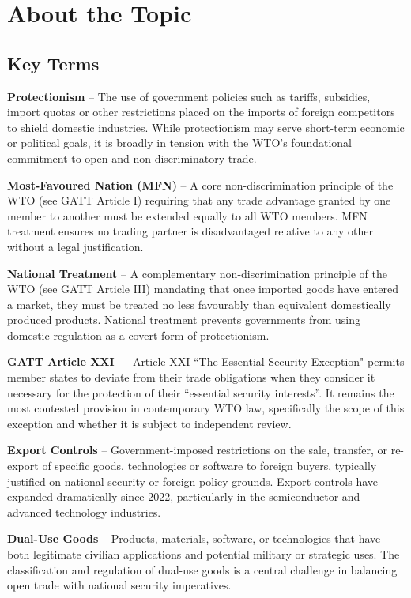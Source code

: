 \section{About the Topic}

\subsection{Key Terms}

\textbf{Protectionism} – The use of government policies such as tariffs, subsidies, import quotas or other restrictions placed on the imports of foreign competitors to shield domestic industries. While protectionism may serve short-term economic or political goals, it is broadly in tension with the WTO’s foundational commitment to open and non-discriminatory trade.

\textbf{Most-Favoured  Nation  (MFN)}  –  A  core non-discrimination principle of the WTO (see GATT Article I) requiring that any trade advantage granted by one member to another must be extended equally to all WTO members. MFN treatment ensures no trading partner is disadvantaged relative to any other without a legal justification.

\textbf{National  Treatment}  –  A  complementary non-discrimination principle of the WTO (see GATT Article III) mandating that once imported goods have entered a market, they must be treated no less favourably than equivalent domestically produced products. National treatment prevents governments from using domestic regulation as a covert form of protectionism.

\textbf{GATT Article XXI} — Article XXI “The Essential Security Exception" permits member states to deviate from their trade obligations when they consider it necessary for the protection of their “essential security interests”. It remains the most contested provision in contemporary WTO law, specifically the scope of this exception and whether it is subject to independent review.

\textbf{Export Controls} – Government-imposed restrictions on the sale, transfer, or re-export of specific goods, technologies or software to foreign buyers, typically justified on national security or foreign policy grounds. Export controls have expanded dramatically since 2022, particularly in the semiconductor and advanced technology industries.

\textbf{Dual-Use Goods} – Products, materials, software, or technologies that have both legitimate civilian applications and potential military or strategic uses. The classification and regulation of dual-use goods is a central challenge in balancing open trade with national security imperatives.

